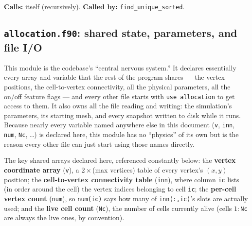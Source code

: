 \documentclass[11pt]{article}
\begin{document}
\textbf{Calls:} itself (recursively). \textbf{Called by:} \texttt{find\_unique\_sorted}.
\subsection{\texttt{allocation.f90}: shared state, parameters, and file I/O}
\label{sec:codealloc}

This module is the codebase's ``central nervous system.'' It declares essentially
every array and variable that the rest of the program shares --- the vertex positions,
the cell-to-vertex connectivity, all the physical parameters, all the on/off feature
flags --- and every other file starts with \texttt{use allocation} to get access to
them. It also owns all the file reading and writing: the simulation's parameters, its
starting mesh, and every snapshot written to disk while it runs. Because nearly every
variable named anywhere else in this document (\texttt{v}, \texttt{inn}, \texttt{num},
\texttt{Nc}, \dots) is declared here, this module has no ``physics'' of its own but is
the reason every other file can just start using those names directly.

The key shared arrays declared here, referenced constantly below: the \textbf{vertex
coordinate array} (\texttt{v}), a $2\times$(max vertices) table of every vertex's
$(x,y)$ position; the \textbf{cell-to-vertex connectivity table} (\texttt{inn}), where
column \texttt{ic} lists (in order around the cell) the vertex indices belonging to
cell \texttt{ic}; the \textbf{per-cell vertex count} (\texttt{num}), so \texttt{num(ic)}
says how many of \texttt{inn(:,ic)}'s slots are actually used; and the \textbf{live cell
count} (\texttt{Nc}), the number of cells currently alive (cells $1{:}$\texttt{Nc} are
always the live ones, by convention).
\end{document}
